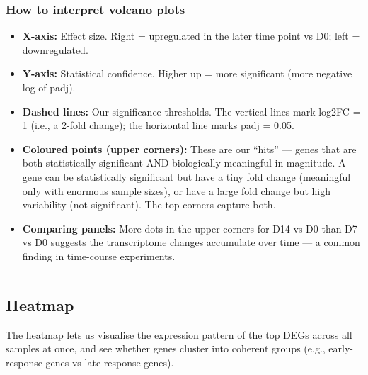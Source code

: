 \documentclass[
]{article}
\providecommand{\tightlist}{%
  \setlength{\itemsep}{0pt}\setlength{\parskip}{0pt}}
\begin{document}
\subsubsection{How to interpret volcano
plots}\label{how-to-interpret-volcano-plots}

\begin{itemize}
\tightlist
\item
  \textbf{X-axis:} Effect size. Right = upregulated in the later time
  point vs D0; left = downregulated.
\item
  \textbf{Y-axis:} Statistical confidence. Higher up = more significant
  (more negative log of padj).
\item
  \textbf{Dashed lines:} Our significance thresholds. The vertical lines
  mark \textbar log2FC\textbar{} = 1 (i.e., a 2-fold change); the
  horizontal line marks padj = 0.05.
\item
  \textbf{Coloured points (upper corners):} These are our ``hits'' ---
  genes that are both statistically significant AND biologically
  meaningful in magnitude. A gene can be statistically significant but
  have a tiny fold change (meaningful only with enormous sample sizes),
  or have a large fold change but high variability (not significant).
  The top corners capture both.
\item
  \textbf{Comparing panels:} More dots in the upper corners for D14 vs
  D0 than D7 vs D0 suggests the transcriptome changes accumulate over
  time --- a common finding in time-course experiments.
\end{itemize}

\begin{center}\rule{0.5\linewidth}{0.5pt}\end{center}

\subsection{Heatmap}\label{heatmap}

The heatmap lets us visualise the expression pattern of the top DEGs
across all samples at once, and see whether genes cluster into coherent
groups (e.g., early-response genes vs late-response genes).
\end{document}
